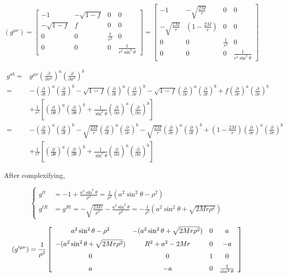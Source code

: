 \documentclass{article}
\newcommand{\be}{\begin{equation}}
\newcommand{\ee}{\end{equation}}
\newcommand{\ba}{\begin{array}}
\newcommand{\ea}{\end{array}}
\newcommand{\p}{\partial}
\newcommand{\1}{\left}
\newcommand{\2}{\right}
\begin{document}
\be
(g^{\mu\nu})=\left[\ba{cccc}-1&-\sqrt{1-f}&0&0\\-\sqrt{1-f}&f&0&0\\0&0&\frac 1 {r^2}&0\\0&0&0&\frac 1 {r^2\sin^2\theta}\ea\right]=\left[\ba{cccc}-1&-\sqrt{\frac{2M}{r}}&0&0\\-\sqrt{\frac{2M}{r}}&(1-\frac{2M}{r})&0&0\\0&0&\frac 1 {r^2}&0\\0&0&0&\frac 1 {r^2\sin^2\theta}\ea\right]
\ee

\be
\begin{split}
g^{ab} =& g^{\mu\nu}\1(\frac \p {\p x^\mu}\2)^a\1(\frac \p {\p x^\nu}\2)^b\\
=& -\1(\frac \p {\p t}\2)^a\1(\frac \p {\p t}\2)^b-\sqrt{1-f}\1(\frac \p {\p t}\2)^a\1(\frac \p {\p r}\2)^b-\sqrt{1-f}\1(\frac \p {\p r}\2)^a\1(\frac \p {\p t}\2)^b+f\1(\frac \p {\p r}\2)^a\1(\frac \p {\p r}\2)^b \\
 & +\frac 1 {r^2} \1[\1(\frac \p {\p\theta}\2)^a \1(\frac \p {\p\theta}\2)^b+\frac 1 {\sin^2 \theta} \1(\frac \p {\p\phi}\2)^a \1(\frac \p {\p\phi}\2)^b \2] \\
=& -\1(\frac \p {\p t}\2)^a\1(\frac \p {\p t}\2)^b-\sqrt{\frac{2M}{r}}\1(\frac \p {\p t}\2)^a\1(\frac \p {\p r}\2)^b-\sqrt{\frac{2M}{r}}\1(\frac \p {\p r}\2)^a\1(\frac \p {\p t}\2)^b+\1(1-\frac{2M}{r}\2)\1(\frac \p {\p r}\2)^a\1(\frac \p {\p r}\2)^b \\
 & +\frac 1 {r^2} \1[\1(\frac \p {\p\theta}\2)^a \1(\frac \p {\p\theta}\2)^b+\frac 1 {\sin^2 \theta} \1(\frac \p {\p\phi}\2)^a \1(\frac \p {\p\phi}\2)^b \2]
\end{split}
\ee 

After complexifying,

\be
\1\{ 
\begin{split}
g^{tt}&=-1+\frac{a^2\sin^2\theta}{\rho^2}=\frac{1}{\rho^2}(a^2\sin^2\theta-\rho^2)\\
g^{tR}&=g^{Rt}=-\sqrt{\frac{2Mr}{\rho^2}}-\frac{a^2\sin^2\theta}{\rho^2}=-\frac{1}{\rho^2}(a^2\sin^2\theta+\sqrt{2Mr\rho^2})
\end{split}
\2.
\ee

\be
(g^{\prime\mu\nu})=\frac{1}{\rho^2}\left[\ba{cccc}a^2\sin^2\theta-\rho^2&-(a^2\sin^2\theta+\sqrt{2Mr\rho^2})&0&a\\ \noalign{\medskip}-(a^2\sin^2\theta+\sqrt{2Mr\rho^2})&R^2+a^2-2Mr&0&-a\\ \noalign{\medskip}0&0&1&0\\ \noalign{\medskip}a&-a&0&\frac 1 {\sin^2\theta}\ea\right]
\ee
\end{document}
